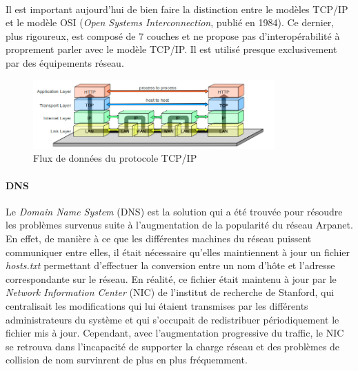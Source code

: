 \paragraph{} Il est important aujourd'hui de bien faire la distinction entre le modèles TCP/IP et le modèle OSI 
(\emph{Open Systems Interconnection}, publié en 1984). Ce dernier, plus rigoureux, est composé de 7 couches et ne
propose pas d'interopérabilité à proprement parler avec le modèle TCP/IP. Il est utilisé presque exclusivement par des
équipements réseau.

\begin{figure}[h]
    \centering
    \includegraphics[width=350px]{chapters/01/images/tcpip_dataflow.png}
    \caption{\label{tcpip_dataflow} Flux de données du protocole TCP/IP}
\end{figure}

\paragraph{DNS} Le \emph{Domain Name System} (DNS) est la solution qui a été trouvée pour résoudre les problèmes survenus
suite à l'augmentation de la popularité du réseau Arpanet. En effet, de manière à ce que les différentes machines du 
réseau puissent communiquer entre elles, il était nécessaire qu'elles maintiennent à jour un fichier \emph{hosts.txt}
permettant d'effectuer la conversion entre un nom d'hôte et l'adresse correspondante sur le réseau. En réalité, ce fichier
était maintenu à jour par le \emph{Network Information Center} (NIC) de l'institut de recherche de Stanford, qui centralisait
les modifications qui lui étaient transmises par les différents administrateurs du système et qui s'occupait de redistribuer
périodiquement le fichier mis à jour. Cependant, avec l'augmentation progressive du traffic, le NIC se retrouva dans
l'incapacité de supporter la charge réseau et des problèmes de collision de nom survinrent de plus en plus fréquemment.

